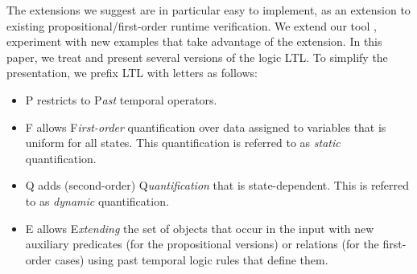 The extensions we suggest are in particular easy to implement, as an extension to existing propositional/first-order runtime verification. We extend our tool \dejavu, experiment with new examples that take advantage of the extension.
\fi
\vspace{1ex}
\label{sec:prelim}
In this paper, we treat and present several versions of the logic LTL. To simplify
the presentation, we prefix LTL with letters as follows:

\begin{itemize}
\item{P} restricts to P{\em ast} temporal operators.
\item{F} allows F{\em irst-order} quantification over
data assigned to variables that is uniform for all states. This quantification is referred to as {\em static} quantification.
\item{Q} adds (second-order) Q{\em uantification} that is state-dependent. This is referred to as {\em dynamic} quantification.
\item{E} allows E{\em xtending} the 
set of objects that occur in the input with
new auxiliary predicates (for the propositional versions) or relations (for the first-order cases) using past temporal logic rules that define them.
\end{itemize}





